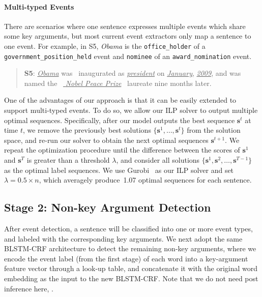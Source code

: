 \paragraph{Multi-typed Events}
There are scenarios where one sentence expresses multiple events which share some key arguments,
but most current event extractors only map a sentence to one event.
For example, in S5, \emph{Obama} is the \texttt{office\_holder} of a \texttt{government\_position\_held} event and \texttt{nominee} of an \texttt{award\_nomination} event.
\begin{quote}
	\textbf{S5}: \underline{\emph{Obama}} was  inaugurated as \underline{\emph{president}} on \underline{\emph{January}}, \underline{\emph{2009}}, and was named the  \underline{\emph{ Nobel  Peace  Prize}}  laureate nine months later.
\end{quote}
One of the advantages of our approach is that it can be easily extended to support multi-typed events.
To do so, we allow our ILP solver to output multiple optimal sequences. Specifically, after our model outputs the best sequence $\bm{s}^t$
at time $t$, we remove the previously best solutions
 $\{\bm{s}^1, \ldots, \bm{s}^{t}\}$ from the solution space, and re-run our solver to obtain the next optimal sequences $\bm{s}^{t+1}$.
We repeat the optimization procedure until the difference between the scores of $\bm{s}^1$ and $\bm{s}^T$ is greater
than a threshold $\lambda$, and consider all solutions $\{\bm{s}^1, \bm{s}^2, \ldots, \bm{s}^{T-1}\}$ as the optimal label sequences.
We use Gurobi~\cite{gurobi} as our ILP solver and set $\lambda=0.5 \times n$, which averagely produce~1.07 optimal sequences for each sentence.

\subsection{Stage 2: Non-key Argument Detection}
After event detection, a sentence will be classified into one or more event types, and labeled with the corresponding key arguments.
%
We next adopt the same BLSTM-CRF architecture %
to detect the remaining non-key arguments, where we encode the event label (from the first stage) %
of each word into a key-argument feature vector through a look-up table, and concatenate it with the original word
embedding as the input to the new BLSTM-CRF. Note that we do not need post inference here, .
